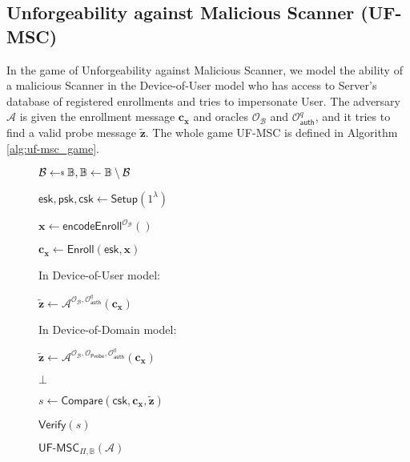 \subsection{Unforgeability against Malicious Scanner (UF-MSC)}
\label{sec:uf-msc_game}

In the game of Unforgeability against Malicious Scanner, we model the ability of a malicious \textsf{Scanner} in the Device-of-User model who has access to \textsf{Server}'s database of registered enrollments and tries to impersonate \textsf{User}. The adversary $\mathcal{A}$ is given the enrollment message $\mathbf{c_x}$ and oracles $\mathcal{O}_{\mathcal{B}}$ and $\mathcal{O}_\textsf{auth}^q$, and it tries to find a valid probe message $\mathbf{\tilde{z}}$. The whole game \textsf{UF-MSC} is defined in Algorithm \ref{alg:uf-msc_game}.

\begin{figure}[h]
\centering
	\begin{minipage}[t]{0.6\linewidth}
	\centering
	\begin{algorithm}[H]
	\caption{$\textsf{UF-MSC}_{\Pi, \mathbb{B}}(\mathcal{A})$}
	\label{alg:uf-msc_game}
	\begin{algorithmic}[1]
		\State $\mathcal{B} \getsdollar \mathbb{B}, \mathbb{B} \gets \mathbb{B} \setminus \mathcal{B}$

		\State $\textsf{esk}, \textsf{psk}, \textsf{csk} \gets \textsf{Setup}(1^\lambda)$

		\State $\mathbf{x} \gets \textsf{encodeEnroll}^{\mathcal{O}_{\mathcal{B}}}()$

		\State $\mathbf{c_x} \gets \textsf{Enroll}(\textsf{esk}, \mathbf{x})$
		
		\State In Device-of-User model:
		
		\State \hspace{\algorithmicindent} ${\mathbf{\tilde{z}}} \gets \mathcal{A}^{ \mathcal{O}_{\mathcal{B}}, \mathcal{O}_\textsf{auth}^q } ( \mathbf{c_x} )$

		\State In Device-of-Domain model:
		
		\State \hspace{\algorithmicindent} ${\mathbf{\tilde{z}}} \gets \mathcal{A}^{ \mathcal{O}_{\mathcal{B}}, \mathcal{O}_\textsf{Probe}, \mathcal{O}_\textsf{auth}^q } ( \mathbf{c_x} )$
		
		
		\State \Return $\bot$
		
		\EndIf
		\State $s \gets \textsf{Compare}( \textsf{csk}, \mathbf{c_x}, \mathbf{\tilde{z}} )$

		\State \Return $\textsf{Verify}(s)$
	\end{algorithmic}
	\end{algorithm}
	\end{minipage}
	
\label{fig:uf-msc_game}
\end{figure}


